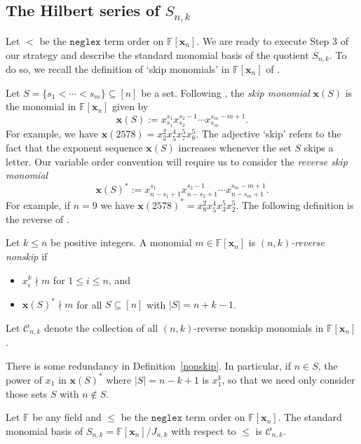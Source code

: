 \documentclass[ALCO,ThmDefs,published]{cedram}
\newcommand{\xx}{{\mathbf {x}}}
\newcommand{\FF}{{\mathbb{F}}}
\theoremstyle{plain}
\newcommand{\neglex}{{\mathtt {neglex}}}
\newcommand{\FF}{{\mathbb{F}}}
\newcommand{\CCC}{{\mathcal{C}}}
\newcommand{\xx}{{\mathbf {x}}}
\begin{document}
\subsection{The Hilbert series of $S_{n,k}$}
Let $<$ be the $\neglex$ term order on $\FF[\xx_n]$.
We are ready to execute Step 3 of our strategy and describe the standard monomial basis 
of the quotient $S_{n,k}$.  To do so, we recall the definition of `skip monomials' in $\FF[\xx_n]$ of \cite{HRS}.

Let $S = \{s_1 < \cdots < s_m \} \subseteq [n]$ be a set.  Following \cite[Defn. 3.2]{HRS},
the \emph{skip monomial} $\xx(S)$ is the monomial in $\FF[\xx_n]$ given by
\begin{equation}
\xx(S) := x_{s_1}^{s_1} x_{s_2}^{s_2 - 1} \cdots x_{s_m}^{s_m-m+1}.
\end{equation}
For example, we have $\xx(2578) = x_2^2 x_5^4 x_7^5 x_8^5$.  The adjective `skip' refers to the fact that 
the exponent sequence $\xx(S)$ increases whenever the set $S$ skips a letter.
Our variable order convention will require us to consider the \emph{reverse skip monomial}
\begin{equation}
\xx(S)^* := x_{n-s_1+1}^{s_1} x_{n-s_2+1}^{s_2-1} \cdots x_{n-s_m+1}^{s_m-m+1}.
\end{equation}
For example, if $n = 9$ we have $\xx(2578)^* = x_8^2 x_5^4 x_3^5 x_2^5$. 
The following definition is the reverse of \cite[Defn. 4.4]{HRS}.

\begin{defn}
\label{nonskip}
Let $k \leq n$ be positive integers.  A monomial $m \in \FF[\xx_n]$ is \emph{$(n,k)$-reverse nonskip} if
\begin{itemize}
\item $x_i^k \nmid m$ for $1 \leq i \leq n$, and
\item $\xx(S)^* \nmid m$ for all $S \subseteq [n]$ with $|S| = n+k-1$.
\end{itemize}
Let $\CCC_{n,k}$ denote the collection of all $(n,k)$-reverse nonskip monomials in $\FF[\xx_n]$.
\end{defn}

There is some redundancy in Definition~\ref{nonskip}.  In particular, if $n \in S$, the power of $x_1$
in $\xx(S)^*$  where $|S| = n-k+1$ is $x_1^k$, so that we need only consider those sets $S$ with $n \notin S$.


\begin{theorem}
\label{standard-monomial-basis}
Let $\FF$ be any field and $\leq$ be the $\neglex$ term order on $\FF[\xx_n]$. The standard monomial basis of $S_{n,k} = {\FF[\xx_n]} / {J_{n,k}}$ with respect to $\leq$ is $\CCC_{n,k}$.
\end{theorem}
\end{document}
